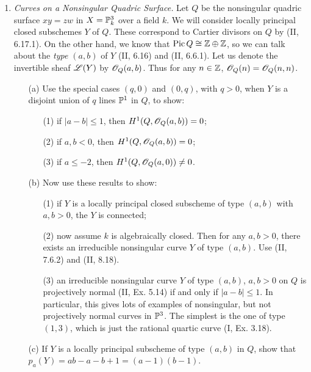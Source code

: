 \documentclass{article}
\begin{document}
\begin{enumerate} [label=\textbf{\arabic*.}, leftmargin=0em]
\item \textit{Curves on a Nonsingular Quadric Surface.} Let $Q$ be the nonsingular quadric surface $xy = zw$ in $X = \mathbb{P}_k^3$ over a field $k$. We will consider locally principal closed subschemes $Y$ of $Q$. These correspond to Cartier divisors on $Q$ by (II, 6.17.1). On the other hand, we know that $\operatorname{Pic}{Q} \cong \mathbb{Z} \oplus \mathbb{Z}$, so we can talk about the \textit{type $(a, b)$} of $Y$ (II, 6.16) and (II, 6.6.1). Let us denote the invertible sheaf $\mathscr{L}(Y)$ by $\mathscr{O}_Q(a, b)$. Thus for any $n \in \mathbb{Z}$, $\mathscr{O}_Q(n) = \mathscr{O}_Q(n, n)$.
\begin{itemize}
  \item[(a)] Use the special cases $(q, 0)$ and $(0, q)$, with $q > 0$, when $Y$ is a disjoint union of $q$ lines $\mathbb{P}^1$ in $Q$, to show:
  \begin{itemize}
    \item[(1)] if $|a - b| \leq 1$, then $H^1(Q, \mathscr{O}_Q(a, b)) = 0$;
    \item[(2)] if $a, b < 0$, then $H^1(Q, \mathscr{O}_Q(a, b)) = 0$;
    \item[(3)] if $a \leq -2$, then $H^1(Q, \mathscr{O}_Q(a, 0)) \neq 0$.
  \end{itemize}
  \item[(b)] Now use these results to show:
  \begin{itemize}
    \item[(1)] if $Y$ is a locally principal closed subscheme of type $(a, b)$ with $a, b > 0$, the $Y$ is connected;
    \item[(2)] now assume $k$ is algebraically closed. Then for any $a, b > 0$, there exists an irreducible nonsingular curve $Y$ of type $(a, b)$. Use (II, 7.6.2) and (II, 8.18).
    \item[(3)] an irreducible nonsingular curve $Y$ of type $(a, b)$, $a, b > 0$ on $Q$ is projectively normal (II, Ex. 5.14) if and only if $|a - b| \leq 1$. In particular, this gives lots of examples of nonsingular, but not projectively normal curves in $\mathbb{P}^3$. The simplest is the one of type $(1, 3)$, which is just the rational quartic curve (I, Ex. 3.18).
  \end{itemize}
  \item[(c)] If $Y$ is a locally principal subscheme of type $(a, b)$ in $Q$, show that $p_a(Y) = ab - a - b + 1 = (a - 1)(b - 1)$.
\end{itemize}


\end{enumerate}
\end{document}
